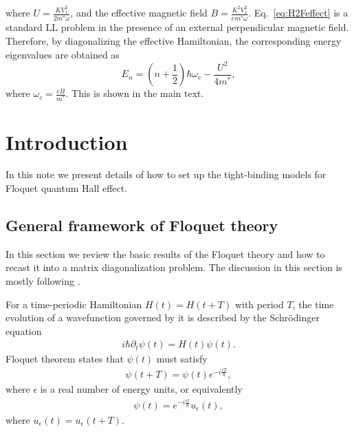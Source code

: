 \documentclass[aps,pra,preprint,showpacs]{revtex4-1}
\begin{document}
where $U=\frac{KV_{1}^{2}}{2m^{\ast}\omega}$, and the effective magnetic field 
$B=\frac{K^{2}V_{1}^{2}}{em^{\ast}\omega}$. Eq.~\eqref{eq:H2Feffect} is a standard LL problem in the presence of an external perpendicular
magnetic field. Therefore, by diagonalizing the effective Hamiltonian, the corresponding energy eigenvalues are obtained as
\begin{equation} \label{eq:Energy}
	E_{n}=(n+\frac{1}{2})\hbar\omega_{c}-\frac{U^{2}}{4m^{\ast}},
\end{equation}
where $\omega_{c}=\frac{eB}{m^{\ast}}$. This is shown in the main text.

\section{Introduction}
In this note we present details of how to set up the tight-binding models for Floquet quantum Hall effect.


\subsection{General framework of Floquet theory}

In this section we review the basic results of the Floquet theory and how to recast it into a matrix diagonalization problem. The discussion in this section is mostly following \cite{AEE}.

For a time-periodic Hamiltonian $H(t) = H(t+T)$ with period $T$, the time evolution of a wavefunction governed by it is described by the Schr\"{o}dinger equation
\begin{eqnarray}\label{eq:SchrHt}
	i\hbar \partial_t \psi(t) = H(t) \psi(t).
\end{eqnarray}
Floquet theorem states that $\psi(t)$ must satisfy
\begin{eqnarray}
	\psi(t+T) = \psi(t) e^{-i \frac{\epsilon T}{\hbar}},
\end{eqnarray}
where $\epsilon$ is a real number of energy units, or equivalently
\begin{eqnarray}
	\psi(t) = e^{-i \frac{\epsilon t}{\hbar}} u_{\epsilon}(t),
\end{eqnarray}
where $u_{\epsilon}(t) = u_{\epsilon}(t+T)$. 
\end{document}
